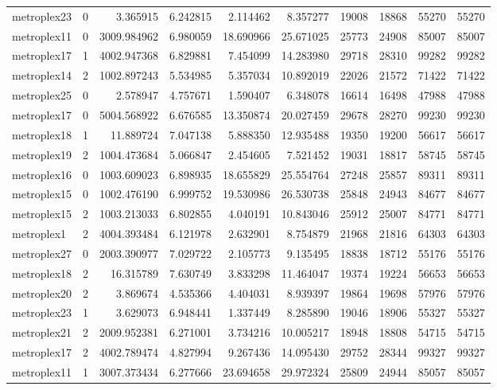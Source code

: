 \begin{longtable}{|l|r|r|r|r|r|r|r|r|r|}
metroplex23 & 0 & 3.365915 & 6.242815 & 2.114462 & 8.357277 & 19008 & 18868 & 55270 & 55270 \\
metroplex11 & 0 & 3009.984962 & 6.980059 & 18.690966 & 25.671025 & 25773 & 24908 & 85007 & 85007 \\
metroplex17 & 1 & 4002.947368 & 6.829881 & 7.454099 & 14.283980 & 29718 & 28310 & 99282 & 99282 \\
metroplex14 & 2 & 1002.897243 & 5.534985 & 5.357034 & 10.892019 & 22026 & 21572 & 71422 & 71422 \\
metroplex25 & 0 & 2.578947 & 4.757671 & 1.590407 & 6.348078 & 16614 & 16498 & 47988 & 47988 \\
metroplex17 & 0 & 5004.568922 & 6.676585 & 13.350874 & 20.027459 & 29678 & 28270 & 99230 & 99230 \\
metroplex18 & 1 & 11.889724 & 7.047138 & 5.888350 & 12.935488 & 19350 & 19200 & 56617 & 56617 \\
metroplex19 & 2 & 1004.473684 & 5.066847 & 2.454605 & 7.521452 & 19031 & 18817 & 58745 & 58745 \\
metroplex16 & 0 & 1003.609023 & 6.898935 & 18.655829 & 25.554764 & 27248 & 25857 & 89311 & 89311 \\
metroplex15 & 0 & 1002.476190 & 6.999752 & 19.530986 & 26.530738 & 25848 & 24943 & 84677 & 84677 \\
metroplex15 & 2 & 1003.213033 & 6.802855 & 4.040191 & 10.843046 & 25912 & 25007 & 84771 & 84771 \\
metroplex1 & 2 & 4004.393484 & 6.121978 & 2.632901 & 8.754879 & 21968 & 21816 & 64303 & 64303 \\
metroplex27 & 0 & 2003.390977 & 7.029722 & 2.105773 & 9.135495 & 18838 & 18712 & 55176 & 55176 \\
metroplex18 & 2 & 16.315789 & 7.630749 & 3.833298 & 11.464047 & 19374 & 19224 & 56653 & 56653 \\
metroplex20 & 2 & 3.869674 & 4.535366 & 4.404031 & 8.939397 & 19864 & 19698 & 57976 & 57976 \\
metroplex23 & 1 & 3.629073 & 6.948441 & 1.337449 & 8.285890 & 19046 & 18906 & 55327 & 55327 \\
metroplex21 & 2 & 2009.952381 & 6.271001 & 3.734216 & 10.005217 & 18948 & 18808 & 54715 & 54715 \\
metroplex17 & 2 & 4002.789474 & 4.827994 & 9.267436 & 14.095430 & 29752 & 28344 & 99327 & 99327 \\
metroplex11 & 1 & 3007.373434 & 6.277666 & 23.694658 & 29.972324 & 25809 & 24944 & 85057 & 85057 \\

\end{longtable}
